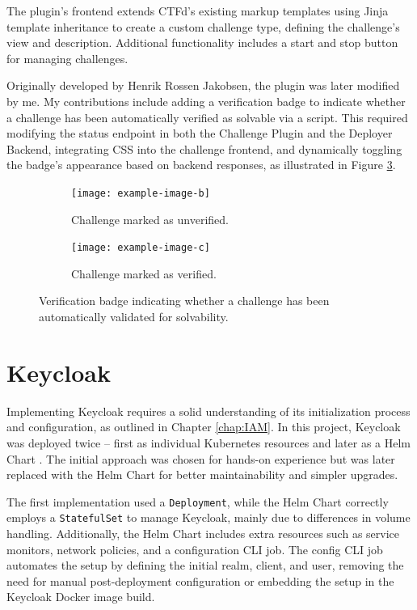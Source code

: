 The plugin's frontend extends CTFd's existing markup templates using Jinja template inheritance to create a custom challenge type, defining the challenge's view and description. Additional functionality includes a start and stop button for managing challenges.

Originally developed by Henrik Rossen Jakobsen, the plugin was later modified by me. My contributions include adding a verification badge to indicate whether a challenge has been automatically verified as solvable via a script. This required modifying the status endpoint in both the Challenge Plugin and the Deployer Backend, integrating CSS into the challenge frontend, and dynamically toggling the badge's appearance based on backend responses, as illustrated in Figure \ref{fig:verification_badge}.

\begin{figure}[h]
    \centering
    \begin{subfigure}[b]{0.45\textwidth}
        \centering
        \texttt{[image: example-image-b]}
        \caption{Challenge marked as unverified.}
        \label{fig:unverified_badge}
    \end{subfigure}
    \hfill
    \begin{subfigure}[b]{0.45\textwidth}
        \centering
        \texttt{[image: example-image-c]}
        \caption{Challenge marked as verified.}
        \label{fig:verified_badge}
    \end{subfigure}
    \caption{Verification badge indicating whether a challenge has been automatically validated for solvability.}
    \label{fig:verification_badge}
\end{figure}

\section{Keycloak}
Implementing Keycloak requires a solid understanding of its initialization process and configuration, as outlined in Chapter \ref{chap:IAM}. In this project, Keycloak was deployed twice -- first as individual Kubernetes resources and later as a Helm Chart \Parencite{bitnamiKeycloakHelm}. The initial approach was chosen for hands-on experience but was later replaced with the Helm Chart for better maintainability and simpler upgrades.

The first implementation used a \texttt{Deployment}, while the Helm Chart correctly employs a \texttt{StatefulSet} to manage Keycloak, mainly due to differences in volume handling. Additionally, the Helm Chart includes extra resources such as service monitors, network policies, and a configuration CLI job. The config CLI job automates the setup by defining the initial realm, client, and user, removing the need for manual post-deployment configuration or embedding the setup in the Keycloak Docker image build.


